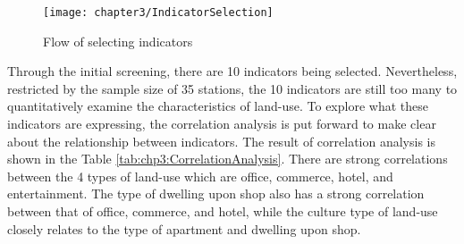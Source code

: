 %
\begin{figure}[htbp]
	\centering
	\texttt{[image: chapter3/IndicatorSelection]}
	\caption{Flow of selecting indicators}
	\label{fig:chp3:IndicatorSelection}
\end{figure}

%
Through the initial screening, there are 10 indicators being selected. Nevertheless, restricted by the sample size of 35 stations, the 10 indicators are still too many to quantitatively examine the characteristics of land-use. To explore what these indicators are expressing, the correlation analysis is put forward to make clear about the relationship between indicators. The result of correlation analysis is shown in the Table \ref{tab:chp3:CorrelationAnalysis}. There are strong correlations between the 4 types of land-use which are office, commerce, hotel, and entertainment. The type of dwelling upon shop also has a strong correlation between that of office, commerce, and hotel, while the culture type of land-use closely relates to the type of apartment and dwelling upon shop.

